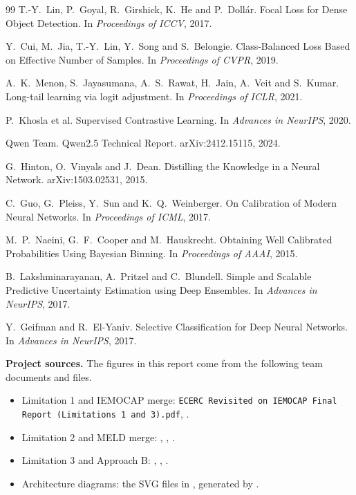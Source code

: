 \documentclass[11pt,a4paper]{article}
\begin{document}
\begin{thebibliography}{99}
 T.-Y.~Lin, P.~Goyal, R.~Girshick, K.~He and P.~Doll\'ar. Focal Loss for Dense Object Detection. In \emph{Proceedings of ICCV}, 2017.

 Y.~Cui, M.~Jia, T.-Y.~Lin, Y.~Song and S.~Belongie. Class-Balanced Loss Based on Effective Number of Samples. In \emph{Proceedings of CVPR}, 2019.

 A.~K.~Menon, S.~Jayasumana, A.~S.~Rawat, H.~Jain, A.~Veit and S.~Kumar. Long-tail learning via logit adjustment. In \emph{Proceedings of ICLR}, 2021.

 P.~Khosla et al. Supervised Contrastive Learning. In \emph{Advances in NeurIPS}, 2020.

 Qwen Team. Qwen2.5 Technical Report. arXiv:2412.15115, 2024.

 G.~Hinton, O.~Vinyals and J.~Dean. Distilling the Knowledge in a Neural Network. arXiv:1503.02531, 2015.

 C.~Guo, G.~Pleiss, Y.~Sun and K.~Q.~Weinberger. On Calibration of Modern Neural Networks. In \emph{Proceedings of ICML}, 2017.

 M.~P.~Naeini, G.~F.~Cooper and M.~Hauskrecht. Obtaining Well Calibrated Probabilities Using Bayesian Binning. In \emph{Proceedings of AAAI}, 2015.

 B.~Lakshminarayanan, A.~Pritzel and C.~Blundell. Simple and Scalable Predictive Uncertainty Estimation using Deep Ensembles. In \emph{Advances in NeurIPS}, 2017.

 Y.~Geifman and R.~El-Yaniv. Selective Classification for Deep Neural Networks. In \emph{Advances in NeurIPS}, 2017.

\end{thebibliography}

\textbf{Project sources.} The figures in this report come from the following team documents and files.

\begin{itemize}
  \item Limitation 1 and IEMOCAP merge: \texttt{ECERC Revisited on IEMOCAP Final Report (Limitations 1 and 3).pdf}, .
  \item Limitation 2 and MELD merge: , , .
  \item Limitation 3 and Approach B: , , .
  \item Architecture diagrams: the SVG files in , generated by .
\end{itemize}
\end{document}
